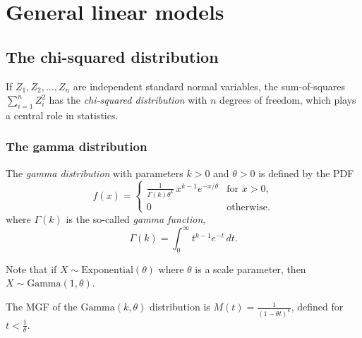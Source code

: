 \chapter{General linear models}\label{chap:bivariate_analysis}
\startcontents[chapters]
\chapcontents

\section{The chi-squared distribution}\label{sec:chi-squared}

If $Z_1,Z_2,\ldots,Z_n$ are independent standard normal %
variables, the sum-of-squares
$\displaystyle\sum_{i=1}^n Z_i^2$
has the \emph{chi-squared distribution} with $n$ degrees of freedom, which plays a central role in statistics.

\subsection{The gamma distribution}
\begin{definition}\label{def:gamma_distribution}
The \emph{gamma distribution} with parameters $k>0$ and $\theta>0$ is defined by the PDF
\[
f(x) = \begin{cases}
	\displaystyle\frac{1}{\Gamma(k)\theta^k}\,x^{k-1} e^{-x/\theta} & \text{for $x>0$}, \\
	0																& \text{otherwise.}
\end{cases}
\]
where $\Gamma(k)$ is the so-called \emph{gamma function},
\[
\Gamma(k) = \int_0^{\infty} t^{k-1}e^{-t}\,dt.
\]
\end{definition}

Note that if $X\sim\text{Exponential}(\theta)$ where $\theta$ is a scale parameter, then $X\sim\text{Gamma}(1,\theta)$.

\begin{lemma}
The MGF of the $\text{Gamma}(k,\theta)$ distribution is $M(t) = \displaystyle\frac{1}{(1-\theta t)^k}$, defined for $t<\displaystyle\frac{1}{\theta}$.
\end{lemma}

